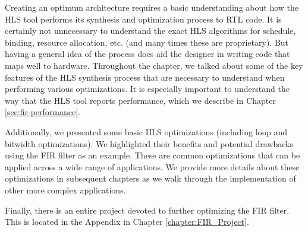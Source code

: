 Creating an optimum architecture requires a basic understanding about how the HLS tool performs its synthesis and optimization process to RTL code. It is certainly not unnecessary to understand the exact HLS algorithms for schedule, binding, resource allocation, etc. (and many times these are proprietary). But having a general idea of the process does aid the designer in writing code that maps well to hardware. Throughout the chapter, we talked about some of the key features of the HLS synthesis process that are necessary to understand when performing various optimizations. It is especially important to understand the way that the HLS tool reports performance, which we describe in Chapter \ref{sec:fir-performance}. 

Additionally, we presented some basic HLS optimizations (including loop and bitwidth optimizations). We highlighted their benefits and potential drawbacks using the FIR filter as an example. These are common optimizations that can be applied across a wide range of applications. We provide more details about these optimizations in subsequent chapters as we walk through the implementation of other more complex applications. 

Finally, there is an entire project devoted to further optimizing the FIR filter. This is located in the Appendix in Chapter \ref{chapter:FIR_Project}. 